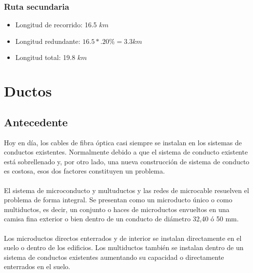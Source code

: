 \documentclass[12pt,letterpaper]{article}
\begin{document}
\subsubsection{Ruta secundaria}
\begin{itemize}
    \item Longitud de recorrido: 16.5 $km$
    \item Longitud redundante: $16.5*.20\%=3.3km$
    \item Longitud total: 19.8 $km$ 
\end{itemize}

\newpage
\section{Ductos}
\subsection{Antecedente}
Hoy en día, los cables de fibra óptica casi siempre se instalan en los sistemas de 
conductos existentes. Normalmente debido a que el sistema de conducto existente está 
sobrellenado y, por otro lado, una nueva construcción de sistema de conducto es costosa, 
esos dos factores constituyen un problema.
\\ \\
El sistema de microconducto y multuductos y las redes de microcable resuelven el problema 
de forma integral. Se presentan como un microducto único o como multiductos, es decir, un 
conjunto o haces de microductos envueltos en una camisa fina exterior o bien dentro de un 
conducto de diámetro 32,40 ó 50 mm.
\\ \\
Los microductos directos enterrados y de interior se instalan directamente en el suelo o 
dentro de los edificios. Los multiductos también se instalan dentro de un sistema de 
conductos existentes aumentando su capacidad o directamente enterrados en el suelo.
\end{document}
